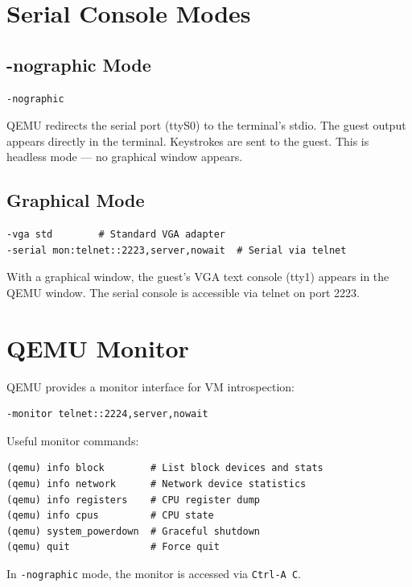 \section{Serial Console Modes}

\subsection{-nographic Mode}

\begin{lstlisting}
-nographic
\end{lstlisting}

QEMU redirects the serial port (ttyS0) to the terminal's stdio. The
guest output appears directly in the terminal. Keystrokes are sent to
the guest. This is headless mode --- no graphical window appears.

\subsection{Graphical Mode}

\begin{lstlisting}
-vga std        # Standard VGA adapter
-serial mon:telnet::2223,server,nowait  # Serial via telnet
\end{lstlisting}

With a graphical window, the guest's VGA text console (tty1) appears in
the QEMU window. The serial console is accessible via telnet on port 2223.

\section{QEMU Monitor}

QEMU provides a monitor interface for VM introspection:

\begin{lstlisting}
-monitor telnet::2224,server,nowait
\end{lstlisting}

Useful monitor commands:
\begin{lstlisting}
(qemu) info block        # List block devices and stats
(qemu) info network      # Network device statistics
(qemu) info registers    # CPU register dump
(qemu) info cpus         # CPU state
(qemu) system_powerdown  # Graceful shutdown
(qemu) quit              # Force quit
\end{lstlisting}

In \texttt{-nographic} mode, the monitor is accessed via \texttt{Ctrl-A C}.

